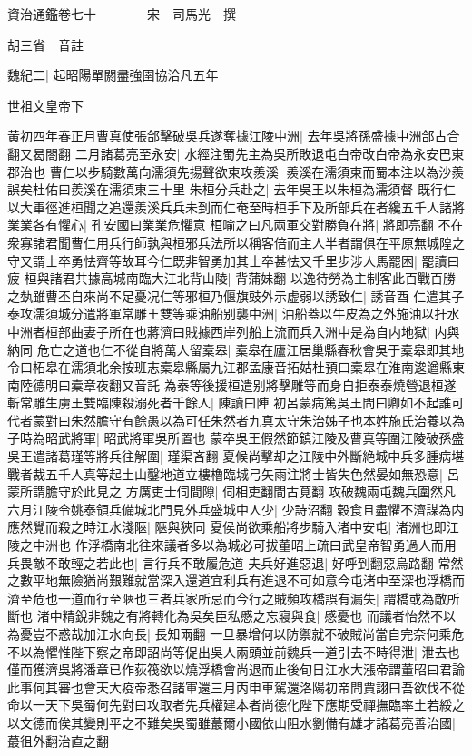 資治通鑑卷七十　　　　宋　司馬光　撰

胡三省　音註

魏紀二|{
	起昭陽單閼盡強圉協洽凡五年}


世祖文皇帝下

黃初四年春正月曹真使張郃擊破吳兵遂奪據江陵中洲|{
	去年吳將孫盛據中洲郃古合翻又曷閤翻}
二月諸葛亮至永安|{
	水經注蜀先主為吳所敗退屯白帝改白帝為永安巴東郡治也}
曹仁以步騎數萬向濡須先揚聲欲東攻羨溪|{
	羨溪在濡須東而蜀本注以為沙羨誤矣杜佑曰羨溪在濡須東三十里}
朱桓分兵赴之|{
	去年吳王以朱桓為濡須督}
既行仁以大軍徑進桓聞之追還羨溪兵兵未到而仁奄至時桓手下及所部兵在者纔五千人諸將業業各有懼心|{
	孔安國曰業業危懼意}
桓喻之曰凡兩軍交對勝負在將|{
	將即亮翻}
不在衆寡諸君聞曹仁用兵行師孰與桓邪兵法所以稱客倍而主人半者謂俱在平原無城隍之守又謂士卒勇怯齊等故耳今仁既非智勇加其士卒甚怯又千里步涉人馬罷困|{
	罷讀曰疲}
桓與諸君共據高城南臨大江北背山陵|{
	背蒲妹翻}
以逸待勞為主制客此百戰百勝之埶雖曹丕自來尚不足憂况仁等邪桓乃偃旗豉外示虚弱以誘致仁|{
	誘音酉}
仁遣其子泰攻濡須城分遣將軍常雕王雙等乘油船别襲中洲|{
	油船蓋以牛皮為之外施油以扞水}
中洲者桓部曲妻子所在也蔣濟曰賊據西岸列船上流而兵入洲中是為自内地獄|{
	内與納同}
危亡之道也仁不從自將萬人留槖皋|{
	槖皋在廬江居巢縣春秋會吳于槖皋即其地令曰柘皋在濡須北余按班志槖皋縣屬九江郡孟康音拓姑杜預曰槖皋在淮南逡遒縣東南陸德明曰槖章夜翻又音託}
為泰等後援桓遣别將擊雕等而身自拒泰泰燒營退桓遂斬常雕生虜王雙臨陳殺溺死者千餘人|{
	陳讀曰陣}
初呂蒙病篤吳王問曰卿如不起誰可代者蒙對曰朱然膽守有餘愚以為可任朱然者九真太守朱治姊子也本姓施氏治養以為子時為昭武將軍|{
	昭武將軍吳所置也}
蒙卒吳王假然節鎮江陵及曹真等圍江陵破孫盛吳王遣諸葛瑾等將兵往解圍|{
	瑾渠吝翻}
夏候尚擊却之江陵中外斷絶城中兵多腫病堪戰者裁五千人真等起土山鑿地道立樓櫓臨城弓矢雨注將士皆失色然晏如無恐意|{
	呂蒙所謂膽守於此見之}
方厲吏士伺間隙|{
	伺相吏翻間古莧翻}
攻破魏兩屯魏兵圍然凡六月江陵令姚泰領兵備城北門見外兵盛城中人少|{
	少詩沼翻}
穀食且盡懼不濟謀為内應然覺而殺之時江水淺陿|{
	陿與狹同}
夏侯尚欲乘船將步騎入渚中安屯|{
	渚洲也即江陵之中洲也}
作浮橋南北往來議者多以為城必可拔董昭上疏曰武皇帝智勇過人而用兵畏敵不敢輕之若此也|{
	言行兵不敢履危道}
夫兵好進惡退|{
	好呼到翻惡烏路翻}
常然之數平地無險猶尚艱難就當深入還道宜利兵有進退不可如意今屯渚中至深也浮橋而濟至危也一道而行至陿也三者兵家所忌而今行之賊頻攻橋誤有漏失|{
	謂橋或為敵所斷也}
渚中精銳非魏之有將轉化為吳矣臣私慼之忘寢與食|{
	慼憂也}
而議者怡然不以為憂豈不惑哉加江水向長|{
	長知兩翻}
一旦暴增何以防禦就不破賊尚當自完奈何乘危不以為懼惟陛下察之帝即詔尚等促出吳人兩頭並前魏兵一道引去不時得泄|{
	泄去也}
僅而獲濟吳將潘章已作荻筏欲以燒浮橋會尚退而止後旬日江水大漲帝謂董昭曰君論此事何其審也會天大疫帝悉召諸軍還三月丙申車駕還洛陽初帝問賈詡曰吾欲伐不從命以一天下吳蜀何先對曰攻取者先兵權建本者尚德化陛下應期受禪撫臨率土若綏之以文德而俟其變則平之不難矣吳蜀雖蕞爾小國依山阻水劉備有雄才諸葛亮善治國|{
	蕞徂外翻治直之翻}
